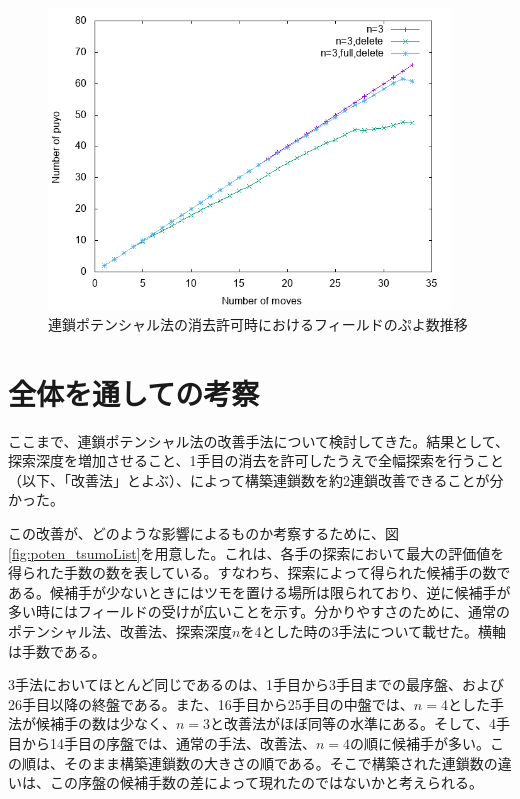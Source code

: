 \documentclass[12pt]{jarticle}
\begin{document}
\begin{figure}[hbt]
  \begin{center}
  \includegraphics[height=8cm]{experiment/Potential/KAI/graph/totalPuyo_N3_N3del_N3fulldel.png}
  \caption{連鎖ポテンシャル法の消去許可時におけるフィールドのぷよ数推移} \label{fig:poten_totalPuyo_del}
\end{center}
\end{figure}



\section{全体を通しての考察}
ここまで、連鎖ポテンシャル法の改善手法について検討してきた。結果として、探索深度を増加させること、1手目の消去を許可したうえで全幅探索を行うこと（以下、「改善法」とよぶ）、によって構築連鎖数を約2連鎖改善できることが分かった。

この改善が、どのような影響によるものか考察するために、図\ref{fig:poten_tsumoList}を用意した。これは、各手の探索において最大の評価値を得られた手数の数を表している。すなわち、探索によって得られた候補手の数である。候補手が少ないときにはツモを置ける場所は限られており、逆に候補手が多い時にはフィールドの受けが広いことを示す。分かりやすさのために、通常のポテンシャル法、改善法、探索深度$n$を4とした時の3手法について載せた。横軸は手数である。

3手法においてほとんど同じであるのは、1手目から3手目までの最序盤、および26手目以降の終盤である。また、16手目から25手目の中盤では、$n=4$とした手法が候補手の数は少なく、$n=3$と改善法がほぼ同等の水準にある。そして、4手目から14手目の序盤では、通常の手法、改善法、$n=4$の順に候補手が多い。この順は、そのまま構築連鎖数の大きさの順である。そこで構築された連鎖数の違いは、この序盤の候補手数の差によって現れたのではないかと考えられる。
\end{document}
